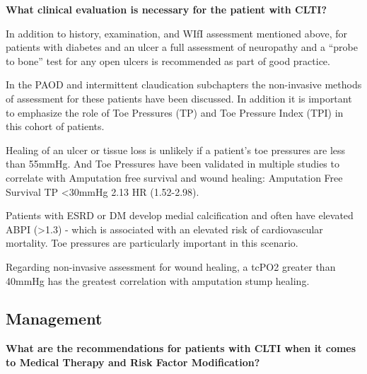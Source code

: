 \documentclass[
]{book}
\begin{document}
\textbf{What clinical evaluation is necessary for the patient with CLTI?}

In addition to history, examination, and WIfI assessment
mentioned above, for patients with diabetes and an ulcer a full
assessment of neuropathy and a ``probe to bone'' test for any open ulcers
is recommended as part of good practice.

In the PAOD and intermittent claudication subchapters the non-invasive
methods of assessment for these patients have been discussed. In addition
it is important to emphasize the role of Toe Pressures (TP) and Toe Pressure
Index (TPI) in this cohort of patients.

Healing of an ulcer or tissue loss is unlikely if a patient's toe pressures
are less than 55mmHg. And Toe Pressures have been validated in multiple studies
to correlate with Amputation free survival and wound healing: Amputation Free
Survival TP \textless30mmHg 2.13 HR (1.52-2.98). \citep{wickström2017, hicks2018}

Patients with ESRD or DM develop medial calcification and often have
elevated ABPI (\textgreater1.3) - which is associated with an elevated risk of
cardiovascular mortality. Toe pressures are particularly important in
this scenario. \citep{resnick2004, vitti1994}

Regarding non-invasive assessment for wound healing, a tcPO2 greater than
40mmHg has the greatest correlation with amputation stump healing.\citep{malone1987}

\hypertarget{management-18}{%
\subsection{Management}\label{management-18}}

\textbf{What are the recommendations for patients with CLTI when it comes to
Medical Therapy and Risk Factor Modification?}
\end{document}
